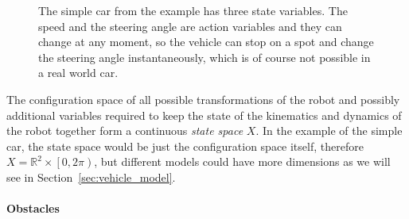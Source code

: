 \begin{figure}
		
	\caption{The simple car from the example has three state variables. The speed and the steering angle are action variables and they can change at any moment, so the vehicle can stop on a spot and change the steering angle instantaneously, which is of course not possible in a real world car.}
\end{figure}

The configuration space of all possible transformations of the robot and possibly additional variables required to keep the state of the kinematics and dynamics of the robot together form a continuous \textit{state space} $X$. In the example of the simple car, the state space would be just the configuration space itself, therefore $X=\mathbb{R}^2\times\left[0,2\pi\right)$, but different models could have more dimensions as we will see in Section~\ref{sec:vehicle_model}.

\paragraph{Obstacles}

